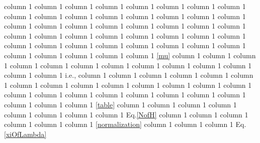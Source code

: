 \documentclass[a4paper,11pt]{article}
\makeatletter
\newcommand*{\ie}{i.e., }
\newcommand*{\Eq}{Eq.\@\xspace}
\makeatother
\begin{document}
  column 1  column 1  column 1  column 1  column 1  column 1  column 1  column 1  column 1  column 1  column 1  column 1  column 1  column 1  column 1  column 1   column 1  column 1  column 1  column 1  column 1   column 1  column 1  column 1  column 1  column 1  column 1  column 1  column 1  column 1 \cite{0812.4950, 0904.1537}  column 1  column 1  column 1  column 1  column 1  column 1  column 1  column 1  column 1    column 1  column 1  column 1  column 1  column 1  column 1 \eqref{mu}  column 1  column 1  column 1  column 1  column 1  column 1  column 1  column 1  column 1  column 1  column 1  column 1  column 1 \ie  column 1  column 1  column 1  column 1  column 1  column 1  column 1  column 1  column 1  column 1  column 1  column 1  column 1  column 1  column 1  column 1   
  column 1  column 1  column 1  column 1  column 1  column 1  column 1  column 1  column 1 \ref{table}  column 1  column 1  column 1   column 1  column 1  column 1   column 1  column 1 \Eq \eqref{NofH}  column 1  column 1  column 1  column 1  column 1  column 1 \eqref{normalization}  column 1  column 1  column 1 \Eq \eqref{xiOfLambda}
\end{document}
